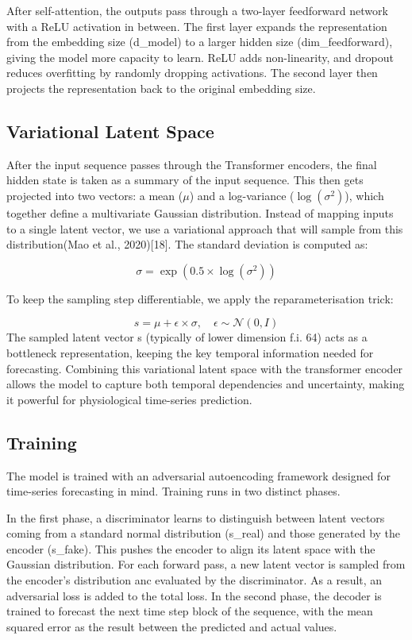 \documentclass[12pt,a4paper]{report}
\begin{document}
After self-attention, the outputs pass through a two-layer feedforward
network with a ReLU activation in between. The first layer expands the
representation from the embedding size (d\_model) to a larger hidden
size (dim\_feedforward), giving the model more capacity to learn. ReLU
adds non-linearity, and dropout reduces overfitting by randomly dropping
activations. The second layer then projects the representation back to
the original embedding size.

\subsection{Variational Latent Space}
After the input sequence passes through the Transformer encoders, the
final hidden state is taken as a summary of the input sequence. This then gets projected into two vectors: a mean ($\mu$) and a log-variance ($\log(\sigma^{2})$), which together define a multivariate
Gaussian distribution. Instead of mapping inputs to a single latent vector, we
use a variational approach that will sample from this distribution(Mao et
al., 2020){[}18{]}. The standard deviation is computed as:

\[
\sigma = \exp\!\left(0.5 \times \log(\sigma^2)\right)
\]

To keep the sampling step differentiable, we apply the
reparameterisation trick:

\[
s = \mu + \epsilon \times \sigma, \quad \epsilon \sim \mathcal{N}(0, I)
\]
The sampled latent vector s (typically of lower dimension f.i. 64) acts
as a bottleneck representation, keeping the key temporal information
needed for forecasting. Combining this variational latent space with the
transformer encoder allows the model to capture both temporal
dependencies and uncertainty, making it powerful for physiological
time-series prediction.


\subsection{Training}
The model is trained with an adversarial autoencoding framework designed
for time-series forecasting in mind. Training runs in two distinct phases.

In the first phase, a discriminator learns to distinguish between latent
vectors coming from a standard normal distribution (s\_real) and those
generated by the encoder (s\_fake). This pushes the encoder to align its
latent space with the Gaussian distribution. For each forward pass, a new latent vector is sampled from the encoder’s distribution anc evaluated by the discriminator. As a result, an adversarial loss is added to the total loss.
In the second phase, the decoder is trained to forecast the
next time step block of the sequence, with the mean squared error as the result between the predicted and actual values. 
\end{document}
